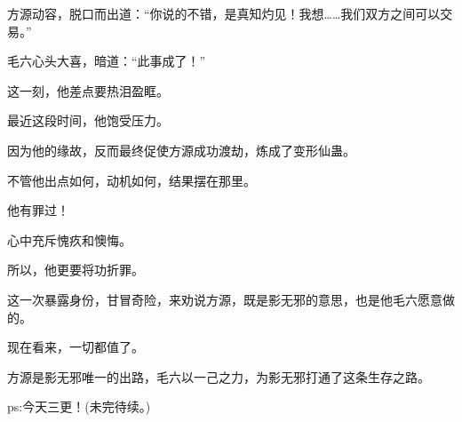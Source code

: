 \begin{this_body}
方源动容，脱口而出道：“你说的不错，是真知灼见！我想……我们双方之间可以交易。”

毛六心头大喜，暗道：“此事成了！”

这一刻，他差点要热泪盈眶。

最近这段时间，他饱受压力。

因为他的缘故，反而最终促使方源成功渡劫，炼成了变形仙蛊。

不管他出点如何，动机如何，结果摆在那里。

他有罪过！

心中充斥愧疚和懊悔。

所以，他更要将功折罪。

这一次暴露身份，甘冒奇险，来劝说方源，既是影无邪的意思，也是他毛六愿意做的。

现在看来，一切都值了。

方源是影无邪唯一的出路，毛六以一己之力，为影无邪打通了这条生存之路。

ps:今天三更！(未完待续。)

\end{this_body}

